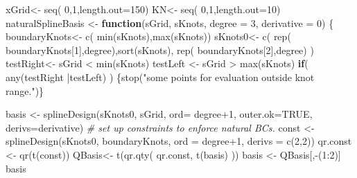 \documentclass[
]{article}
\newenvironment{Shaded}{\begin{snugshade}}{\end{snugshade}}
\newcommand{\AttributeTok}[1]{\textcolor[rgb]{0.77,0.63,0.00}{#1}}
\newcommand{\CommentTok}[1]{\textcolor[rgb]{0.56,0.35,0.01}{\textit{#1}}}
\newcommand{\ConstantTok}[1]{\textcolor[rgb]{0.00,0.00,0.00}{#1}}
\newcommand{\ControlFlowTok}[1]{\textcolor[rgb]{0.13,0.29,0.53}{\textbf{#1}}}
\newcommand{\DecValTok}[1]{\textcolor[rgb]{0.00,0.00,0.81}{#1}}
\newcommand{\FunctionTok}[1]{\textcolor[rgb]{0.00,0.00,0.00}{#1}}
\newcommand{\NormalTok}[1]{#1}
\newcommand{\OtherTok}[1]{\textcolor[rgb]{0.56,0.35,0.01}{#1}}
\newcommand{\SpecialCharTok}[1]{\textcolor[rgb]{0.00,0.00,0.00}{#1}}
\newcommand{\StringTok}[1]{\textcolor[rgb]{0.31,0.60,0.02}{#1}}
\begin{document}
\begin{Shaded}
\begin{Highlighting}[]
\NormalTok{xGrid}\OtherTok{\textless{}{-}} \FunctionTok{seq}\NormalTok{( }\DecValTok{0}\NormalTok{,}\DecValTok{1}\NormalTok{,}\AttributeTok{length.out=}\DecValTok{150}\NormalTok{)}
\NormalTok{KN}\OtherTok{\textless{}{-}} \FunctionTok{seq}\NormalTok{( }\DecValTok{0}\NormalTok{,}\DecValTok{1}\NormalTok{,}\AttributeTok{length.out=}\DecValTok{10}\NormalTok{)}
\NormalTok{naturalSplineBasis }\OtherTok{\textless{}{-}} \ControlFlowTok{function}\NormalTok{(sGrid,}
\NormalTok{                               sKnots,}
                               \AttributeTok{degree =} \DecValTok{3}\NormalTok{,}
                               \AttributeTok{derivative =} \DecValTok{0}\NormalTok{) \{}
\NormalTok{  boundaryKnots}\OtherTok{\textless{}{-}} \FunctionTok{c}\NormalTok{( }\FunctionTok{min}\NormalTok{(sKnots),}\FunctionTok{max}\NormalTok{(sKnots))}
\NormalTok{  sKnots0}\OtherTok{\textless{}{-}} \FunctionTok{c}\NormalTok{( }\FunctionTok{rep}\NormalTok{( boundaryKnots[}\DecValTok{1}\NormalTok{],degree),}\FunctionTok{sort}\NormalTok{(sKnots),}
               \FunctionTok{rep}\NormalTok{( boundaryKnots[}\DecValTok{2}\NormalTok{],degree) )}
\NormalTok{  testRight}\OtherTok{\textless{}{-}}\NormalTok{ sGrid }\SpecialCharTok{\textless{}} \FunctionTok{min}\NormalTok{(sKnots) }
\NormalTok{  testLeft }\OtherTok{\textless{}{-}}\NormalTok{ sGrid }\SpecialCharTok{\textgreater{}} \FunctionTok{max}\NormalTok{(sKnots)             }
  \ControlFlowTok{if}\NormalTok{( }\FunctionTok{any}\NormalTok{(testRight }\SpecialCharTok{|}\NormalTok{testLeft) )}
\NormalTok{  \{}\FunctionTok{stop}\NormalTok{(}\StringTok{"some points for evaluation outside knot range."}\NormalTok{)\}}
               
\NormalTok{  basis }\OtherTok{\textless{}{-}} \FunctionTok{splineDesign}\NormalTok{(sKnots0, sGrid,}
                        \AttributeTok{ord=}\NormalTok{ degree}\SpecialCharTok{+}\DecValTok{1}\NormalTok{, }\AttributeTok{outer.ok=}\ConstantTok{TRUE}\NormalTok{,}
                        \AttributeTok{derivs=}\NormalTok{derivative)}
  \CommentTok{\# set up constraints to enforce natural BCs.}
\NormalTok{  const }\OtherTok{\textless{}{-}} \FunctionTok{splineDesign}\NormalTok{(sKnots0, boundaryKnots, }\AttributeTok{ord =}\NormalTok{ degree}\SpecialCharTok{+}\DecValTok{1}\NormalTok{,}
                        \AttributeTok{derivs =} \FunctionTok{c}\NormalTok{(}\DecValTok{2}\NormalTok{,}\DecValTok{2}\NormalTok{)) }
\NormalTok{  qr.const }\OtherTok{\textless{}{-}} \FunctionTok{qr}\NormalTok{(}\FunctionTok{t}\NormalTok{(const))}
\NormalTok{  QBasis}\OtherTok{\textless{}{-}} \FunctionTok{t}\NormalTok{(}\FunctionTok{qr.qty}\NormalTok{( qr.const, }\FunctionTok{t}\NormalTok{(basis) ))}
\NormalTok{  basis }\OtherTok{\textless{}{-}}\NormalTok{ QBasis[,}\SpecialCharTok{{-}}\NormalTok{(}\DecValTok{1}\SpecialCharTok{:}\DecValTok{2}\NormalTok{)]}
\NormalTok{  basis}
  

\end{Highlighting}
\end{Shaded}
\end{document}
